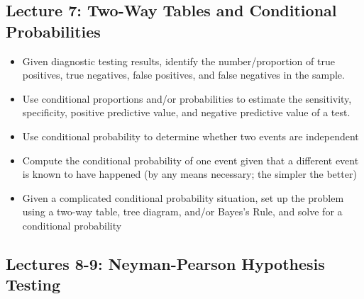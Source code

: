 \documentclass[11pt]{article} %
\begin{document}
\subsection{Lecture 7: Two-Way Tables and Conditional Probabilities}

\begin{itemize}
\item Given diagnostic testing results, identify the number/proportion of true positives, true negatives, false positives, and false negatives in the sample.
\item Use conditional proportions and/or probabilities to estimate the sensitivity, specificity, positive predictive value, and negative predictive value of a test.
\item Use conditional probability to determine whether two events are independent
\item Compute the conditional probability of one event given that a different event is known to have happened (by any means necessary; the simpler the better)
\item Given a complicated conditional probability situation, set up the problem using a two-way table, tree diagram, and/or Bayes's Rule, and solve for a conditional probability
\end{itemize}

\newpage


\subsection{Lectures 8-9: Neyman-Pearson Hypothesis Testing}
\end{document}
